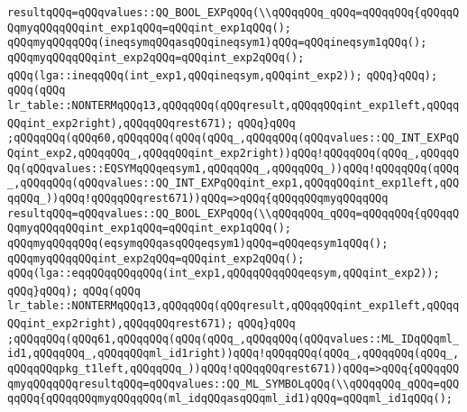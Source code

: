 \verb|resultqQQq=qQQqvalues::QQ_BOOL_EXPqQQq(\\qQQqqQQq_qQQq=qQQqqQQq{qQQqqQQqmyqQQqqQQqint_exp1qQQq=qQQqint_exp1qQQq();|\newline
\verb|qQQqmyqQQqqQQq(ineqsymqQQqasqQQqineqsym1)qQQq=qQQqineqsym1qQQq();|\newline
\verb|qQQqmyqQQqqQQqint_exp2qQQq=qQQqint_exp2qQQq();|\newline
\verb|qQQq(lga::ineqqQQq(int_exp1,qQQqineqsym,qQQqint_exp2));|\newline
\verb|qQQq}qQQq);|\newline
\verb|qQQq(qQQq|\newline
\verb|lr_table::NONTERMqQQq13,qQQqqQQq(qQQqresult,qQQqqQQqint_exp1left,qQQqqQQqint_exp2right),qQQqqQQqrest671);|\newline
\verb|qQQq}qQQq|\newline
\verb|;qQQqqQQq(qQQq60,qQQqqQQq(qQQq(qQQq_,qQQqqQQq(qQQqvalues::QQ_INT_EXPqQQqint_exp2,qQQqqQQq_,qQQqqQQqint_exp2right))qQQq!qQQqqQQq(qQQq_,qQQqqQQq(qQQqvalues::EQSYMqQQqeqsym1,qQQqqQQq_,qQQqqQQq_))qQQq!qQQqqQQq(qQQq_,qQQqqQQq(qQQqvalues::QQ_INT_EXPqQQqint_exp1,qQQqqQQqint_exp1left,qQQqqQQq_))qQQq!qQQqqQQqrest671))qQQq=>qQQq{qQQqqQQqmyqQQqqQQq|\newline
\verb|resultqQQq=qQQqvalues::QQ_BOOL_EXPqQQq(\\qQQqqQQq_qQQq=qQQqqQQq{qQQqqQQqmyqQQqqQQqint_exp1qQQq=qQQqint_exp1qQQq();|\newline
\verb|qQQqmyqQQqqQQq(eqsymqQQqasqQQqeqsym1)qQQq=qQQqeqsym1qQQq();|\newline
\verb|qQQqmyqQQqqQQqint_exp2qQQq=qQQqint_exp2qQQq();|\newline
\verb|qQQq(lga::eqqQQqqQQqqQQq(int_exp1,qQQqqQQqqQQqeqsym,qQQqint_exp2));|\newline
\verb|qQQq}qQQq);|\newline
\verb|qQQq(qQQq|\newline
\verb|lr_table::NONTERMqQQq13,qQQqqQQq(qQQqresult,qQQqqQQqint_exp1left,qQQqqQQqint_exp2right),qQQqqQQqrest671);|\newline
\verb|qQQq}qQQq|\newline
\verb|;qQQqqQQq(qQQq61,qQQqqQQq(qQQq(qQQq_,qQQqqQQq(qQQqvalues::ML_IDqQQqml_id1,qQQqqQQq_,qQQqqQQqml_id1right))qQQq!qQQqqQQq(qQQq_,qQQqqQQq(qQQq_,qQQqqQQqpkg_t1left,qQQqqQQq_))qQQq!qQQqqQQqrest671))qQQq=>qQQq{qQQqqQQqmyqQQqqQQqresultqQQq=qQQqvalues::QQ_ML_SYMBOLqQQq(\\qQQqqQQq_qQQq=qQQqqQQq{qQQqqQQqmyqQQqqQQq(ml_idqQQqasqQQqml_id1)qQQq=qQQqml_id1qQQq();|\newline
